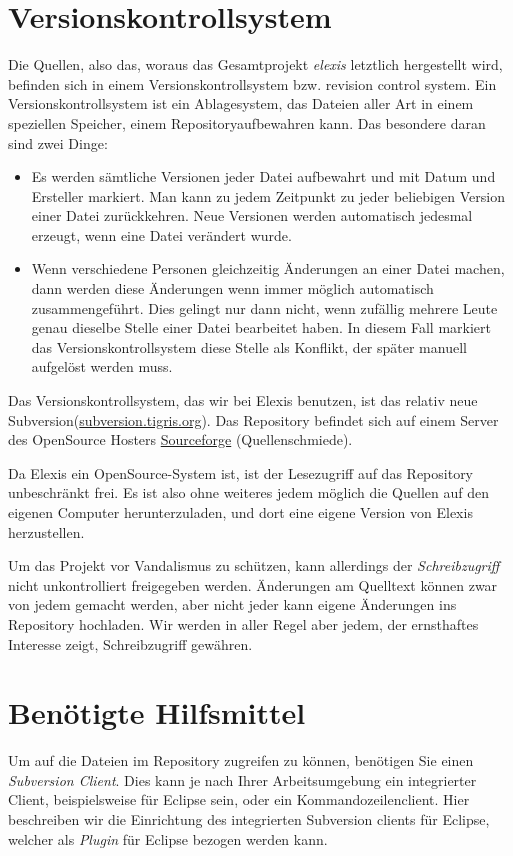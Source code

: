 \section{Versionskontrollsystem}
Die Quellen, also das, woraus das Gesamtprojekt \textit{elexis} letztlich
hergestellt wird, befinden sich in einem Versionskontrollsystem
 bzw.
\glqq revision control system\grqq. Ein Versionskontrollsystem ist ein
Ablagesystem, das Dateien aller Art in einem speziellen Speicher, einem \glqq
Repository\grqq {}aufbewahren kann. Das besondere daran sind zwei Dinge:
\begin{itemize}
\item Es werden sämtliche Versionen jeder Datei aufbewahrt und mit Datum und
Ersteller markiert. Man kann zu jedem Zeitpunkt zu jeder beliebigen Version
einer Datei zurückkehren. Neue Versionen werden automatisch jedesmal erzeugt,
wenn eine Datei verändert wurde.
\item Wenn verschiedene Personen gleichzeitig Änderungen an einer Datei machen,
dann werden diese Änderungen wenn immer möglich automatisch zusammengeführt.
Dies gelingt nur dann nicht, wenn zufällig mehrere Leute genau dieselbe Stelle
einer Datei bearbeitet haben. In diesem Fall markiert das Versionskontrollsystem
diese Stelle als Konflikt, der später manuell aufgelöst werden muss.
\end{itemize}

Das Versionskontrollsystem, das wir bei Elexis benutzen, ist das relativ neue \glqq
Sub\-ver\-sion\grqq (\href{http://subversion.tigris.org}{subversion.tigris.org}). 
Das Repository befindet sich auf einem Server des OpenSource Hosters
\href{http://www.sourceforge.net}{Sourceforge} (\glqq Quellenschmiede\grqq).

Da Elexis ein OpenSource-System ist, ist der Lesezugriff auf das Repository
unbeschränkt frei. Es ist also ohne weiteres jedem möglich die Quellen auf den
eigenen Computer herunterzuladen, und dort eine eigene Version von Elexis
herzustellen.

Um das Projekt vor Vandalismus zu schützen, kann allerdings der
\textit{Schreibzugriff} nicht unkontrolliert freigegeben werden. Änderungen am
Quelltext können zwar von jedem gemacht werden, aber nicht jeder kann eigene
Änderungen ins Repository hochladen. Wir werden in aller Regel aber jedem, der
ernsthaftes Interesse zeigt, Schreibzugriff gewähren.

\section{Benötigte Hilfsmittel}
Um auf die Dateien im Repository zugreifen zu können, benötigen Sie einen
\textit{Subversion Client}. Dies kann je nach Ihrer Arbeitsumgebung ein
integrierter Client, beispielsweise für Eclipse sein, oder ein
Kommandozeilenclient. Hier beschreiben wir die Einrichtung des integrierten
Subversion clients für Eclipse, welcher als \textit{Plugin} für Eclipse
bezogen werden kann.
